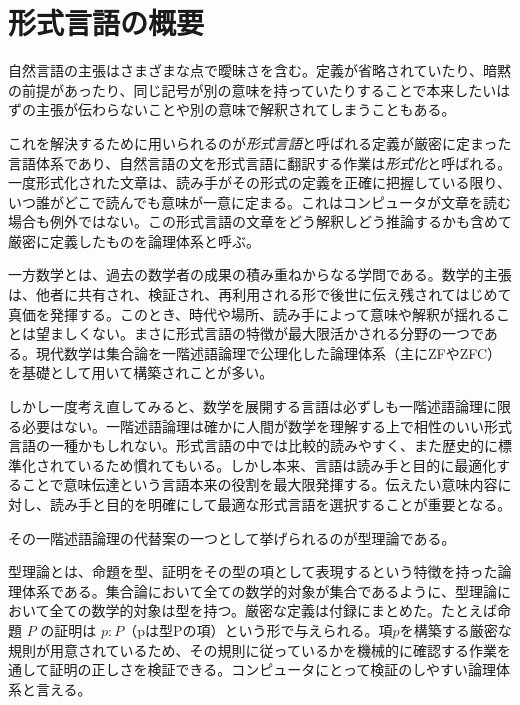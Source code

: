 \documentclass[a4paper,12pt]{bxjsbook}
\newlength{\customindent}
\newenvironment{body}{
  \par
  \begingroup
  \setlength{\leftskip}{\customindent}
  \setlength{\rightskip}{0pt}
  \setlength{\parindent}{1em}
  \setlength{\displayindent}{\customindent}
  \setlength{\displaywidth}{\dimexpr\linewidth-\customindent\relax}
}{
  \par
  \endgroup
}
\theoremstyle{theorem}
\begin{document}
    \section{形式言語の概要}
    \begin{body}
        \indent 自然言語の主張はさまざまな点で曖昧さを含む。定義が省略されていたり、暗黙の前提があったり、同じ記号が別の意味を持っていたりすることで本来したいはずの主張が伝わらないことや別の意味で解釈されてしまうこともある。

        \indent これを解決するために用いられるのが\emph{形式言語}と呼ばれる定義が厳密に定まった言語体系であり、自然言語の文を形式言語に翻訳する作業は\emph{形式化}と呼ばれる。一度形式化された文章は、読み手がその形式の定義を正確に把握している限り、いつ誰がどこで読んでも意味が一意に定まる。これはコンピュータが文章を読む場合も例外ではない。この形式言語の文章をどう解釈しどう推論するかも含めて厳密に定義したものを論理体系と呼ぶ。

        \indent 一方数学とは、過去の数学者の成果の積み重ねからなる学問である。数学的主張は、他者に共有され、検証され、再利用される形で後世に伝え残されてはじめて真価を発揮する。このとき、時代や場所、読み手によって意味や解釈が揺れることは望ましくない。まさに形式言語の特徴が最大限活かされる分野の一つである。現代数学は集合論を一階述語論理で公理化した論理体系（主にZFやZFC）を基礎として用いて構築されことが多い。

        \indent しかし一度考え直してみると、数学を展開する言語は必ずしも一階述語論理に限る必要はない。一階述語論理は確かに人間が数学を理解する上で相性のいい形式言語の一種かもしれない。形式言語の中では比較的読みやすく、また歴史的に標準化されているため慣れてもいる。しかし本来、言語は読み手と目的に最適化することで意味伝達という言語本来の役割を最大限発揮する。伝えたい意味内容に対し、読み手と目的を明確にして最適な形式言語を選択することが重要となる。

        \indent その一階述語論理の代替案の一つとして挙げられるのが型理論である。

        \indent 型理論とは、命題を型、証明をその型の項として表現するという特徴を持った論理体系である。集合論において全ての数学的対象が集合であるように、型理論において全ての数学的対象は型を持つ。厳密な定義は付録にまとめた。たとえば命題 $P$ の証明は $p:P$（pは型Pの項）という形で与えられる。項$p$を構築する厳密な規則が用意されているため、その規則に従っているかを機械的に確認する作業を通して証明の正しさを検証できる。コンピュータにとって検証のしやすい論理体系と言える。

    \end{body}
\end{document}
